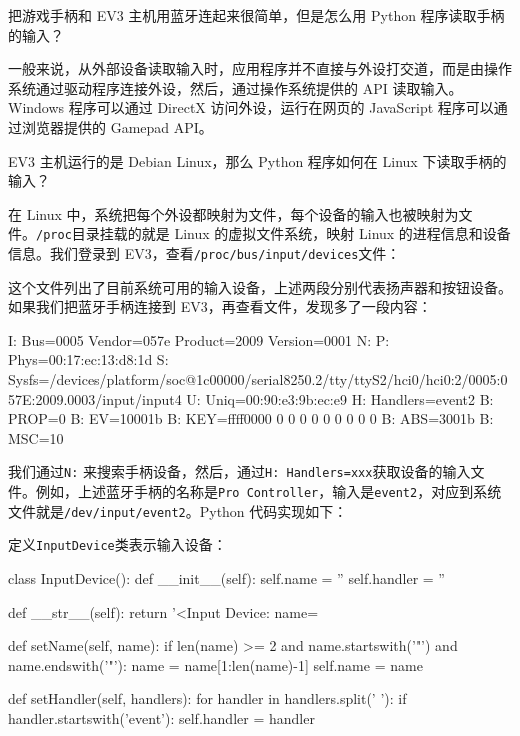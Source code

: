 把游戏手柄和 EV3 主机用蓝牙连起来很简单，但是怎么用 Python
程序读取手柄的输入？

一般来说，从外部设备读取输入时，应用程序并不直接与外设打交道，而是由操作系统通过驱动程序连接外设，然后，通过操作系统提供的
API 读取输入。Windows 程序可以通过 DirectX 访问外设，运行在网页的
JavaScript 程序可以通过浏览器提供的 Gamepad API。

EV3 主机运行的是 Debian Linux，那么 Python 程序如何在 Linux
下读取手柄的输入？

在 Linux
中，系统把每个外设都映射为文件，每个设备的输入也被映射为文件。\texttt{/proc}目录挂载的就是
Linux 的虚拟文件系统，映射 Linux 的进程信息和设备信息。我们登录到
EV3，查看\texttt{/proc/bus/input/devices}文件：


这个文件列出了目前系统可用的输入设备，上述两段分别代表扬声器和按钮设备。如果我们把蓝牙手柄连接到
EV3，再查看文件，发现多了一段内容：

\begin{pythoncode}
I: Bus=0005 Vendor=057e Product=2009 Version=0001
N: 
P: Phys=00:17:ec:13:d8:1d
S: Sysfs=/devices/platform/soc@1c00000/serial8250.2/tty/ttyS2/hci0/hci0:2/0005:057E:2009.0003/input/input4
U: Uniq=00:90:e3:9b:ec:e9
H: Handlers=event2 
B: PROP=0
B: EV=10001b
B: KEY=ffff0000 0 0 0 0 0 0 0 0 0
B: ABS=3001b
B: MSC=10
\end{pythoncode}

我们通过\texttt{N:}
来搜索手柄设备，然后，通过\texttt{H:\ Handlers=xxx}获取设备的输入文件。例如，上述蓝牙手柄的名称是\texttt{Pro\ Controller}，输入是\texttt{event2}，对应到系统文件就是\texttt{/dev/input/event2}。Python
代码实现如下：

定义\texttt{InputDevice}类表示输入设备：

\begin{pythoncode}
class InputDevice():
    def __init__(self):
        self.name = ''
        self.handler = ''

    def __str__(self):
        return '<Input Device: name=%

    def setName(self, name):
        if len(name) >= 2 and name.startswith('"') and name.endswith('"'):
            name = name[1:len(name)-1]
        self.name = name

    def setHandler(self, handlers):
        for handler in handlers.split(' '):
            if handler.startswith('event'):
                self.handler = handler
\end{pythoncode}

